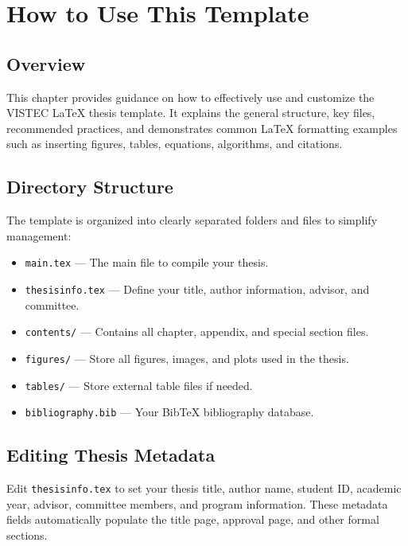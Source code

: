 \chapter{How to Use This Template}
\label{chapter3}

\section{Overview}
\begin{paragraph}
This chapter provides guidance on how to effectively use and customize the VISTEC {\LaTeX} thesis template. It explains the general structure, key files, recommended practices, and demonstrates common {\LaTeX} formatting examples such as inserting figures, tables, equations, algorithms, and citations.
\end{paragraph}

\section{Directory Structure}
\begin{paragraph}
The template is organized into clearly separated folders and files to simplify management:

\begin{itemize}[leftmargin=\paritemindent]
    \item \texttt{main.tex} — The main file to compile your thesis.
    \item \texttt{thesisinfo.tex} — Define your title, author information, advisor, and committee.
    \item \texttt{contents/} — Contains all chapter, appendix, and special section files.
    \item \texttt{figures/} — Store all figures, images, and plots used in the thesis.
    \item \texttt{tables/} — Store external table files if needed.
    \item \texttt{bibliography.bib} — Your BibTeX bibliography database.
\end{itemize}
\end{paragraph}

\section{Editing Thesis Metadata}
\begin{paragraph}
Edit \texttt{thesisinfo.tex} to set your thesis title, author name, student ID, academic year, advisor, committee members, and program information. These metadata fields automatically populate the title page, approval page, and other formal sections.
\end{paragraph}

